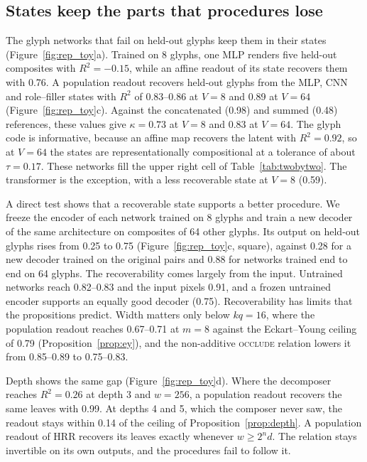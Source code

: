 \subsection{States keep the parts that procedures lose}
\label{sec:states}

The glyph networks that fail on held-out glyphs keep them in their states (Figure~\ref{fig:rep_toy}a). Trained on 8 glyphs, one MLP renders five held-out composites with $R^2 = -0.15$, while an affine readout of its state recovers them with 0.76. A population readout recovers held-out glyphs from the MLP, CNN and role--filler states with $R^2$ of 0.83--0.86 at $V = 8$ and 0.89 at $V = 64$ (Figure~\ref{fig:rep_toy}c). Against the concatenated (0.98) and summed (0.48) references, these values give $\kappa = 0.73$ at $V = 8$ and $0.83$ at $V = 64$. The glyph code is informative, because an affine map recovers the latent with $R^2 = 0.92$, so at $V = 64$ the states are representationally compositional at a tolerance of about $\tau = 0.17$. These networks fill the upper right cell of Table~\ref{tab:twobytwo}. The transformer is the exception, with a less recoverable state at $V = 8$ (0.59).

A direct test shows that a recoverable state supports a better procedure. We freeze the encoder of each network trained on 8 glyphs and train a new decoder of the same architecture on composites of 64 other glyphs. Its output on held-out glyphs rises from 0.25 to 0.75 (Figure~\ref{fig:rep_toy}c, square), against 0.28 for a new decoder trained on the original pairs and 0.88 for networks trained end to end on 64 glyphs. The recoverability comes largely from the input. Untrained networks reach 0.82--0.83 and the input pixels 0.91, and a frozen untrained encoder supports an equally good decoder (0.75). Recoverability has limits that the propositions predict. Width matters only below $kq = 16$, where the population readout reaches 0.67--0.71 at $m = 8$ against the Eckart--Young ceiling of 0.79 (Proposition~\ref{prop:ey}), and the non-additive \textsc{occlude} relation lowers it from 0.85--0.89 to 0.75--0.83.

Depth shows the same gap (Figure~\ref{fig:rep_toy}d). Where the decomposer reaches $R^2 = 0.26$ at depth 3 and $w = 256$, a population readout recovers the same leaves with 0.99. At depths 4 and 5, which the composer never saw, the readout stays within 0.14 of the ceiling of Proposition~\ref{prop:depth}. A population readout of HRR recovers its leaves exactly whenever $w \ge 2^n d$. The relation stays invertible on its own outputs, and the procedures fail to follow it.

